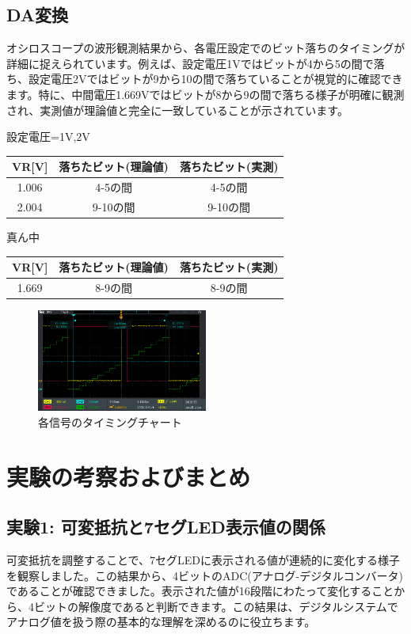 \documentclass[a4paper,11pt,xelatex,ja=standard]{bxjsarticle}
\begin{document}
    \subsection{DA変換}

        オシロスコープの波形観測結果から、各電圧設定でのビット落ちのタイミングが詳細に捉えられています。例えば、設定電圧1Vではビットが4から5の間で落ち、設定電圧2Vではビットが9から10の間で落ちていることが視覚的に確認できます。特に、中間電圧1.669Vではビットが8から9の間で落ちる様子が明確に観測され、実測値が理論値と完全に一致していることが示されています。

        設定電圧=1V,2V
        \begin{tabular}{|c|c|c|}
            \hline
            VR[V] & 落ちたビット(理論値) & 落ちたビット(実測) \\
            \hline
            1.006 & 4-5の間 & 4-5の間 \\
            \hline
            2.004 & 9-10の間 & 9-10の間 \\
            \hline
        \end{tabular}

        真ん中

        \begin{tabular}{|c|c|c|}
            \hline
            VR[V] & 落ちたビット(理論値) & 落ちたビット(実測) \\
            \hline
            1.669 & 8-9の間 & 8-9の間 \\
            \hline
        \end{tabular}

        \begin{figure}[H]
            \centering
            \includegraphics[width=0.5\textwidth]{./img/24-6-1/2.png}
            \caption{各信号のタイミングチャート}
        \end{figure}
\section{実験の考察およびまとめ}

    \subsection{実験1: 可変抵抗と7セグLED表示値の関係}
        可変抵抗を調整することで、7セグLEDに表示される値が連続的に変化する様子を観察しました。この結果から、4ビットのADC(アナログ-デジタルコンバータ)であることが確認できました。表示された値が16段階にわたって変化することから、4ビットの解像度であると判断できます。この結果は、デジタルシステムでアナログ値を扱う際の基本的な理解を深めるのに役立ちます。
\end{document}
